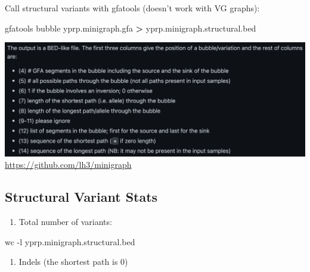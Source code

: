 \documentclass[
]{book}
\newenvironment{Shaded}{\begin{snugshade}}{\end{snugshade}}
\newcommand{\AttributeTok}[1]{\textcolor[rgb]{0.77,0.63,0.00}{#1}}
\newcommand{\ExtensionTok}[1]{#1}
\newcommand{\FunctionTok}[1]{\textcolor[rgb]{0.00,0.00,0.00}{#1}}
\newcommand{\KeywordTok}[1]{\textcolor[rgb]{0.13,0.29,0.53}{\textbf{#1}}}
\newcommand{\NormalTok}[1]{#1}
\newcommand{\OperatorTok}[1]{\textcolor[rgb]{0.81,0.36,0.00}{\textbf{#1}}}
\newcommand{\StringTok}[1]{\textcolor[rgb]{0.31,0.60,0.02}{#1}}
\providecommand{\tightlist}{%
  \setlength{\itemsep}{0pt}\setlength{\parskip}{0pt}}
\begin{document}
Call structural variants with gfatools (doesn't work with VG graphs):

\begin{Shaded}
\begin{Highlighting}[]
\ExtensionTok{gfatools}\NormalTok{ bubble yprp.minigraph.gfa }\OperatorTok{\textgreater{}}\NormalTok{ yprp.minigraph.structural.bed}
\end{Highlighting}
\end{Shaded}

\includegraphics[width=1\textwidth,height=\textheight]{./Figures/BED.png}
\url{https://github.com/lh3/minigraph}

\hypertarget{structural-variant-stats}{%
\subsection*{Structural Variant Stats}\label{structural-variant-stats}}

\begin{enumerate}
\def\labelenumi{\arabic{enumi}.}
\tightlist
\item
  Total number of variants:
\end{enumerate}

\begin{Shaded}
\begin{Highlighting}[]
\FunctionTok{wc} \AttributeTok{{-}l}\NormalTok{ yprp.minigraph.structural.bed}
\end{Highlighting}
\end{Shaded}

\begin{enumerate}
\def\labelenumi{\arabic{enumi}.}
\setcounter{enumi}{1}
\tightlist
\item
  Indels (the shortest path is 0)
\end{enumerate}

\begin{Shaded}
\end{Shaded}
\end{document}
